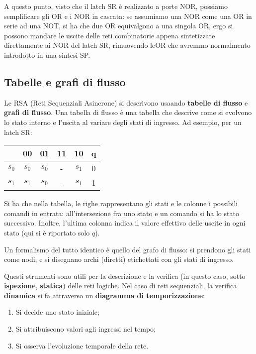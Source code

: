 \documentclass[a4paper,11pt]{article}
\begin{document}
A questo punto, visto che il latch SR è realizzato a porte NOR, possiamo semplificare gli OR e i NOR in cascata: se assumiamo una NOR come una OR in serie ad una NOT, si ha che due OR equivalgono a una singola OR, ergo si possono mandare le uscite delle reti combinatorie appena sintetizzate direttamente ai NOR del latch SR, rimuovendo leOR che avremmo normalmento introdotto in una sintesi SP. 

\subsection{Tabelle e grafi di flusso}
Le RSA (Reti Sequenziali Asincrone) si descrivono usaando \textbf{tabelle di flusso} e \textbf{grafi di flusso}.
Una tabella di flusso è una tabella che descrive come si evolvono lo stato interno e l'uscita al variare degli stati di ingresso.
Ad esempio, per un latch SR:

\begin{table}[h!]
	\center 
	\begin{tabular} { c | c | c | c | c || c }
		& 00 & 01 & 11 & 10 & q \\ 
		\hline 
		$s_0$ & $s_0$ & $s_0$ & - & $s_1$ & 0 \\ 
		$s_1$ & $s_1$ & $s_0$ & - & $s_1$ & 1\\
	\end{tabular}
\end{table}

Si ha che nella tabella, le righe rappresentano gli stati e le colonne i possibili comandi in entrata: all'intersezione fra uno stato e un comando si ha lo stato successivo.
Inoltre, l'ultima colonna indica il valore effettivo delle uscite in ogni stato (qui si è riportato solo $q$).

Un formalismo del tutto identico è quello del grafo di flusso: si prendono gli stati come nodi, e si disegnano archi (diretti) etichettati con gli stati di ingresso. \TODO %

Questi strumenti sono utili per la descrizione e la verifica (in questo caso, sotto \textbf{ispezione}, \textbf{statica}) delle reti logiche.
Nel caso di reti sequenziali, la verifica \textbf{dinamica} si fa attraverso un \textbf{diagramma di temporizzazione}: 
\begin{enumerate}
	\item Si decide uno stato iniziale;
	\item Si attribuiscono valori agli ingressi nel tempo;
	\item Si osserva l'evoluzione temporale della rete.
\end{enumerate}
\end{document}
